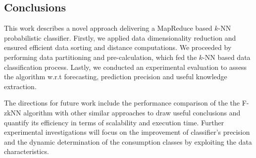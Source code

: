 \subsection{Conclusions}
\label{sec:sec_conc}
This work describes a novel approach delivering a MapReduce based $k$-NN probabilistic classifier. Firstly, we applied data dimensionality reduction and ensured efficient data sorting and distance computations. We proceeded by performing data partitioning and pre-calculation, which fed the $k$-NN based data classification process. Lastly, we conducted an experimental evaluation to assess the algorithm w.r.t forecasting, prediction precision and useful knowledge extraction.

The directions for future work include the performance comparison of the the F-zkNN algorithm with other similar approaches to draw useful conclusions and quantify its efficiency in terms of scalability and execution time. Further experimental investigations will focus on the improvement of classifier's precision and the dynamic determination of the consumption classes by exploiting the data characteristics.